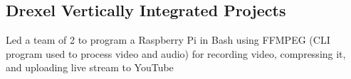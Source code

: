 \documentclass[]{deedy-resume-openfont}
\begin{document}
\begin{minipage}[t]{0.66\textwidth}
    \subsection{Drexel Vertically Integrated Projects}
    \begin{tightemize}
        \item Led a team of 2 to program a Raspberry Pi in Bash using FFMPEG (CLI program used to process video and audio) for recording video, compressing it, and uploading live stream to YouTube
    \end{tightemize}
    \sectionsep



\end{minipage}
\end{document}
